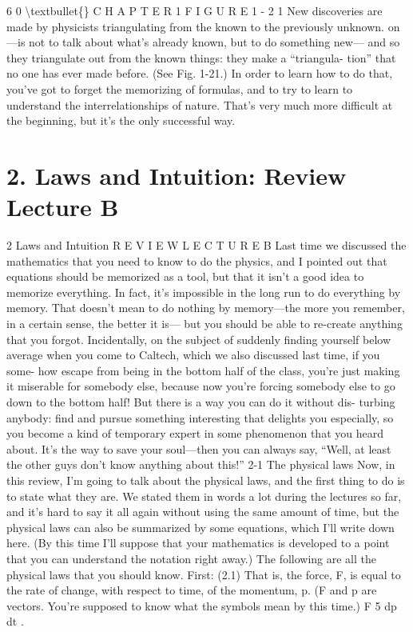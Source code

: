 \documentclass[10pt,oneside]{article}
\begin{document}
6 0 \textbackslash{}textbullet\{\} C H A P T E R  1 F I G U R E 1 - 2 1 New discoveries are made by physicists triangulating from the known to the previously unknown. on---is not to talk about what’s already known, but to do something new--- and so they triangulate out from the known things: they make a “triangula- tion” that no one has ever made before. (See Fig. 1-21.) In order to learn how to do that, you’ve got to forget the memorizing of formulas, and to try to learn to understand the interrelationships of nature. That’s very much more difficult at the beginning, but it’s the only successful way.\par

\clearpage
{}
\section*{2. Laws and Intuition: Review Lecture B}
\label{tips-sec-10-2-laws-and-intuition-review-lecture-b}
2 Laws and Intuition R E V I E W  L E C T U R E  B Last time we discussed the mathematics that you need to know to do the physics, and I pointed out that equations should be memorized as a tool, but that it isn’t a good idea to memorize everything. In fact, it’s impossible in the long run to do everything by memory. That doesn’t mean to do nothing by memory---the more you remember, in a certain sense, the better it is--- but you should be able to re-create anything that you forgot. Incidentally, on the subject of suddenly finding yourself below average when you come to Caltech, which we also discussed last time, if you some- how escape from being in the bottom half of the class, you’re just making it miserable for somebody else, because now you’re forcing somebody else to go down to the bottom half! But there is a way you can do it without dis- turbing anybody: find and pursue something interesting that delights you especially, so you become a kind of temporary expert in some phenomenon that you heard about. It’s the way to save your soul---then you can always say, “Well, at least the other guys don’t know anything about this!” 2-1 The physical laws Now, in this review, I’m going to talk about the physical laws, and the first thing to do is to state what they are. We stated them in words a lot during the lectures so far, and it’s hard to say it all again without using the same amount of time, but the physical laws can also be summarized by some equations, which I’ll write down here. (By this time I’ll suppose that your mathematics is developed to a point that you can understand the notation right away.) The following are all the physical laws that you should know. First: (2.1) That is, the force, F, is equal to the rate of change, with respect to time, of the momentum, p. (F and p are vectors. You’re supposed to know what the symbols mean by this time.) F 5 dp dt .\par
\end{document}
